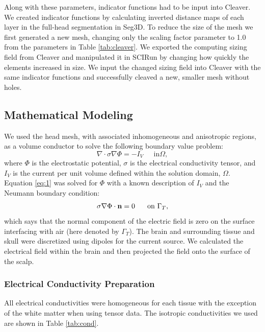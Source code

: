 Along with these parameters, indicator functions had to be input into Cleaver. We created indicator functions by calculating inverted distance maps of each layer in the full-head segmentation in Seg3D. To reduce the size of the mesh we first generated a new mesh, changing only the scaling factor parameter to 1.0 from the parameters in Table \ref{tab:cleaver}. We exported the computing sizing field from Cleaver and manipulated it in SCIRun by changing how quickly the elements increased in size. We input the changed sizing field into Cleaver with the same indicator functions and successfully cleaved a new, smaller mesh without holes.

\subsection{Mathematical Modeling}
\label{sec:math}


We used the head mesh, with associated inhomogeneous and anisotropic regions, as a volume conductor to solve the following boundary value problem:
%
\begin{equation}
\label{eq:1} \nabla\cdot\sigma\nabla\Phi = -I_{V} \;\;\;\;\mbox{ in
}\Omega,
\end{equation} 
%
where $\Phi$ is the electrostatic potential, $\sigma$ is the electrical conductivity tensor, and $I_{V}$ is the current per unit volume defined within the solution domain, $\Omega$. Equation \ref{eq:1} was solved for $\Phi$ with a known description of $I_{V}$ and the Neumann boundary condition:
%
\begin{equation} \sigma\nabla\Phi\cdot{\bf
n} = 0\;\;\;\;\;\mbox{ on }\Gamma_{T}, 
\end{equation} 
%
which says that the normal component of the electric field is zero on the surface interfacing with air (here denoted by $\Gamma_{T}$). The brain and surrounding tissue and skull were discretized using dipoles for the current source. We calculated the electrical field within the brain and then projected the field onto the surface of the scalp. \cite{ref:math}

\subsubsection{Electrical Conductivity Preparation}
\label{sec:cond}

All electrical conductivities were homogeneous for each tissue with the exception of the white matter when using tensor data. The isotropic conductivities \cite{ref:cond} we used are shown in Table \ref{tab:cond}.

